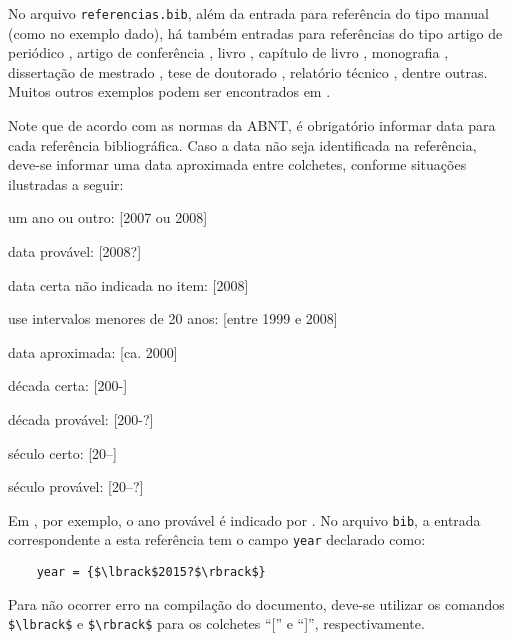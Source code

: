 No arquivo \texttt{referencias.bib}, além da entrada para referência do tipo manual (como no exemplo dado), há também entradas para referências do tipo artigo de periódico \cite{greenwade93}, artigo de conferência \cite{martin1997}, livro \cite{schaum1956}, capítulo de livro \cite{bates2010}, monografia \cite{morgado1990}, dissertação de mestrado \cite{macedo2005}, tese de doutorado \cite{guizzardi2005}, relatório técnico \cite{KrueBansBierDaziRash20}, dentre outras. Muitos outros exemplos podem ser encontrados em \cite{abntex2cite}.

Note que de acordo com as normas da ABNT, é obrigatório informar data para cada referência bibliográfica. Caso a data não seja identificada na referência, deve-se informar uma data aproximada entre colchetes, conforme situações ilustradas a seguir:

\begin{alineas}
    \item um ano ou outro: [2007 ou 2008]
    \item data provável: [2008?]
    \item data certa não indicada no item: [2008]
    \item use intervalos menores de 20 anos: [entre 1999 e 2008]
    \item data aproximada: [ca. 2000]
    \item década certa: [200-]
    \item década provável: [200-?]
    \item século certo: [20--]
    \item século provável: [20--?]
\end{alineas}

Em , por exemplo, o ano provável é indicado por \citeyear{Metodista}. No arquivo \texttt{bib}, a entrada correspondente a esta referência tem o campo \texttt{year} declarado como:
\begin{verbatim}
    year = {$\lbrack$2015?$\rbrack$}
\end{verbatim}
Para não ocorrer erro na compilação do documento, deve-se utilizar os comandos \verb|$\lbrack$| e \verb|$\rbrack$| para os colchetes ``['' e ``]'', respectivamente.